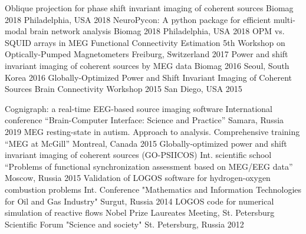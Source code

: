 \begin{cventries}
    \cvconf
    {Oblique projection for phase shift invariant imaging of coherent sources}
    {Biomag 2018}
    {Philadelphia, USA}
    {2018}
    \cvconf
    {NeuroPycon: A python package for efficient multi-modal brain network analysis}
    {Biomag 2018}
    {Philadelphia, USA}
    {2018}
    \cvconf
    {OPM vs. SQUID arrays in MEG Functional Connectivity Estimation}
    {5th Workshop on Optically-Pumped Magnetometers}
    {Freiburg, Switzerland}
    {2017}
    \cvconf
    {Power and shift invariant imaging of coherent sources by MEG data}
    {Biomag 2016}
    {Seoul, South Korea}
    {2016}
    \cvconf
    {Globally-Optimized Power and Shift Invariant Imaging of Coherent Sources}
    {Brain Connectivity Workshop 2015}
    {San Diego, USA}
    {2015}
\end{cventries}
\begin{cventries}
  \cvconf
    {Cognigraph: a real-time EEG-based source imaging software}
    {International conference ``Brain-Computer Interface: Science and Practice''}
    {Samara, Russia}
    {2019}
  \cvconf
    {MEG resting-state in autism. Approach to analysis.}
    {Comprehensive training ``MEG at McGill''}
    {Montreal, Canada}
    {2015}
  \cvconf
  {Globally-optimized power and shift invariant imaging of coherent sources (GO-PSIICOS)}
    {Int. scientific school ``Problems of functional synchronization assessment based on MEG/EEG data''}
    {Moscow, Russia}
    {2015}
  \cvconf
    {Validation of LOGOS software for hydrogen-oxygen combustion problems}
    {Int. Conference "Mathematics and Information Technologies for Oil and Gas Industry"}
    {Surgut, Russia}
    {2014}
    {}
  \cvconf
    {LOGOS code for numerical simulation of reactive flows}
    {Nobel Prize Laureates Meeting, St. Petersburg Scientific Forum "Science and society"}
    {St. Petersburg, Russia}
    {2012}
    {
    }
\end{cventries}
